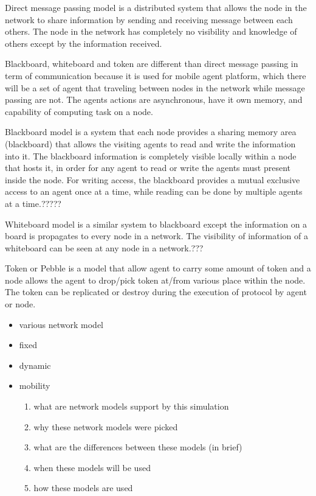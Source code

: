 Direct message passing model is a distributed system that allows the node in the network to share information by sending and receiving message between each others. The node in the network has completely no visibility and knowledge of others except by the information received.

Blackboard, whiteboard and token are different than direct message passing in term of communication because it is used for mobile agent platform, which there will be a set of agent that traveling between nodes in the network while message passing are not. The agents actions are asynchronous, have it own memory, and capability of computing task on a node.

Blackboard model is a system that each node provides a sharing memory area (blackboard) that allows the visiting agents to read and write the information into it. The blackboard information is completely visible locally within a node that hosts it, in order for any agent to read or write the agents must present inside the node. For writing access, the blackboard provides a mutual exclusive access to an agent once at a time, while reading can be done by multiple agents at a time.?????

Whiteboard model is a similar system to blackboard except the information on a board is propagates to every node in a network. The visibility of information of a whiteboard can be seen at any node in a network.???

Token or Pebble is a model that allow agent to carry some amount of token and a node allows the agent to drop/pick  token at/from various place within the node. The token can be replicated or destroy during the execution of protocol by agent or node.


\begin{itemize}
\item various network model
\item fixed
\item dynamic
\item mobility
    \begin{enumerate}
    \item what are network models support by this simulation
    \item why these network models were picked
    \item what are the differences between these models (in brief)
    \item when these models will be used
    \item how these models are used
    \end{enumerate}
\end{itemize}

